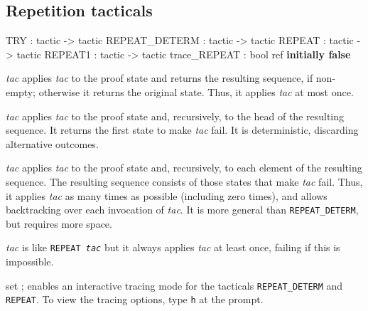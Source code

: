 \subsection{Repetition tacticals}
\begin{ttbox} 
TRY           : tactic -> tactic
REPEAT_DETERM : tactic -> tactic
REPEAT        : tactic -> tactic
REPEAT1       : tactic -> tactic
trace_REPEAT  : bool ref \hfill{\bf initially false}
\end{ttbox}
\begin{ttdescription}
\item[\ttindexbold{TRY} {\it tac}] 
applies {\it tac\/} to the proof state and returns the resulting sequence,
if non-empty; otherwise it returns the original state.  Thus, it applies
{\it tac\/} at most once.

\item[\ttindexbold{REPEAT_DETERM} {\it tac}] 
applies {\it tac\/} to the proof state and, recursively, to the head of the
resulting sequence.  It returns the first state to make {\it tac\/} fail.
It is deterministic, discarding alternative outcomes.

\item[\ttindexbold{REPEAT} {\it tac}] 
applies {\it tac\/} to the proof state and, recursively, to each element of
the resulting sequence.  The resulting sequence consists of those states
that make {\it tac\/} fail.  Thus, it applies {\it tac\/} as many times as
possible (including zero times), and allows backtracking over each
invocation of {\it tac}.  It is more general than {\tt REPEAT_DETERM}, but
requires more space.

\item[\ttindexbold{REPEAT1} {\it tac}] 
is like \hbox{\tt REPEAT {\it tac}} but it always applies {\it tac\/} at
least once, failing if this is impossible.

\item[set \ttindexbold{trace_REPEAT};] 
enables an interactive tracing mode for the tacticals {\tt REPEAT_DETERM}
and {\tt REPEAT}.  To view the tracing options, type {\tt h} at the prompt.
\end{ttdescription}


